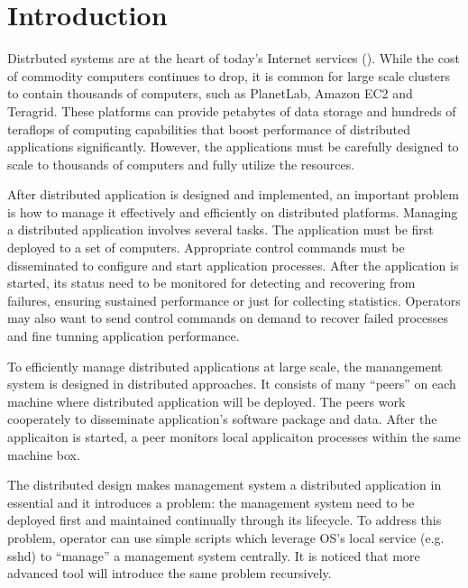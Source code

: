 \section{Introduction}


Distrbuted systems are at the heart of today's Internet
services (). While the cost of commodity
computers continues to drop, it is common for large scale
clusters to contain thousands of computers, such as
PlanetLab, Amazon EC2 and Teragrid. These platforms can
provide petabytes of data storage and hundreds of teraflops
of computing capabilities that boost performance of
distributed applications significantly. However, the
applications must be carefully designed to scale to
thousands of computers and fully utilize the resources.

After distributed application is designed and implemented,
an important problem is how to manage it effectively and
efficiently on distributed platforms. Managing a distributed
application involves several tasks. The application must be
first deployed to a set of computers. Appropriate control
commands must be disseminated to configure and start
application processes. After the application is started, its
status need to be monitored for detecting and recovering
from failures, ensuring sustained performance or just for
collecting statistics. Operators may also want to send
control commands on demand to recover failed processes and
fine tunning application performance.

To efficiently manage distributed applications at large
scale, the manangement system is designed in distributed
approaches. It consists of many ``peers'' on each machine
where distributed application will be deployed. The peers
work cooperately to disseminate application's software
package and data. After the applicaiton is started, a peer
monitors local applicaiton processes within the same machine
box.

The distributed design makes management system a distributed
application in essential and it introduces a problem: the
management system need to be deployed first and maintained
continually through its lifecycle. To address this problem,
operator can use simple scripts which leverage OS's local
service (e.g. sshd) to ``manage'' a management system
centrally. It is noticed that more advanced tool will
introduce the same problem recursively.

